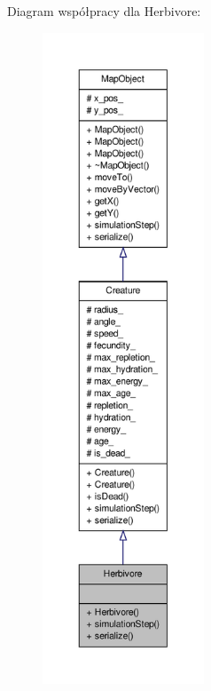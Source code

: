 Diagram współpracy dla Herbivore\-:
\nopagebreak
\begin{figure}[H]
\begin{center}
\leavevmode
\includegraphics[height=550pt]{classHerbivore__coll__graph}
\end{center}
\end{figure}
